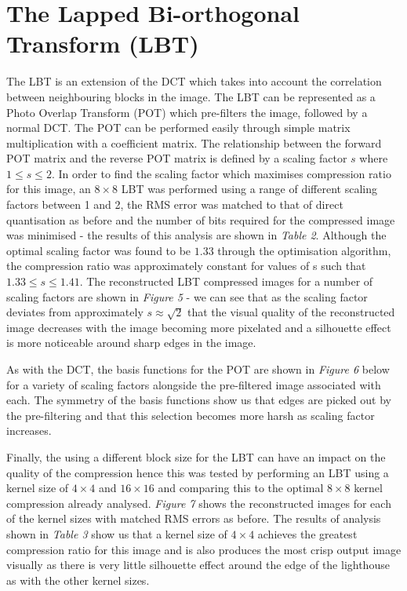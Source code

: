 \documentclass{article}					%
\begin{document}
\section{The Lapped Bi-orthogonal Transform (LBT)}

The LBT is an extension of the DCT which takes into account the correlation between neighbouring blocks in the image. The LBT can be represented as a Photo Overlap Transform (POT) which pre-filters the image, followed by a normal DCT. The POT can be performed easily through simple matrix multiplication with a coefficient matrix. The relationship between the forward POT matrix and the reverse POT matrix is defined by a scaling factor $s$ where $1\leq s \leq 2$. In order to find the scaling factor which maximises compression ratio for this image, an $8 \times 8$ LBT was performed using a range of different scaling factors between 1 and 2, the RMS error was matched to that of direct quantisation as before and the number of bits required for the compressed image was minimised - the results of this analysis are shown in \textit{Table 2}. Although the optimal scaling factor was found to be $1.33$ through the optimisation algorithm, the compression ratio was approximately constant for values of s such that $1.33\leq s \leq 1.41$. The reconstructed LBT compressed images for a number of scaling factors are shown in \textit{Figure 5} - we can see that as the scaling factor deviates from approximately $s\approx\sqrt{2}$ that the visual quality of the reconstructed image decreases with the image becoming more pixelated and a silhouette effect is more noticeable around sharp edges in the image.

As with the DCT, the basis functions for the POT are shown in \textit{Figure 6} below for a variety of scaling factors alongside the pre-filtered image associated with each. The symmetry of the basis functions show us that edges are picked out by the pre-filtering and that this selection becomes more harsh as scaling factor increases.

Finally, the using a different block size for the LBT can have an impact on the quality of the compression hence this was tested by performing an LBT using a kernel size of $4\times 4$ and $16\times 16$ and comparing this to the optimal $8\times 8$ kernel compression already analysed. \textit{Figure 7} shows the reconstructed images for each of the kernel sizes with matched RMS errors as before. The results of analysis shown in \textit{Table 3} show us that a kernel size of $4\times 4$ achieves the greatest compression ratio for this image and is also produces the most crisp output image visually as there is very little silhouette effect around the edge of the lighthouse as with the other kernel sizes.
\end{document}
